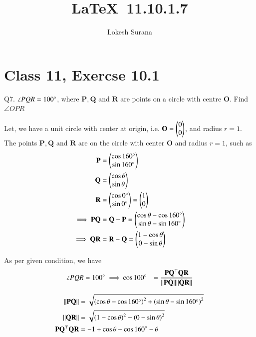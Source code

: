 \documentclass[journal,12pt,twocolumn]{IEEEtran}
\let\vec\mathbf
\begin{document}
\vspace{3cm}
\title{\LaTeX\ 11.10.1.7}
\author{Lokesh Surana}
\maketitle
\section*{Class 11, Exercse 10.1}

Q7. $\angle{PQR} = 100\degree$, where $\vec{P}, \vec{Q}$ and $\vec{R}$ are points on a circle with centre $\vec{O}$. Find $\angle{OPR}$

\solution 
Let, we have a unit circle with center at origin, i.e. $\vec{O} = \myvec{0\\0}$, and radius $r = 1$.
The points $\vec{P}, \vec{Q}$ and $\vec{R}$ are on the circle with center $\vec{O}$ and radius $r = 1$, such as
\begin{align}
    \vec{P} &= \myvec{\cos160\degree\\\sin160\degree} \\
    \vec{Q} &= \myvec{\cos\theta\\\sin\theta}  \\
    \vec{R} &= \myvec{\cos0\degree \\ \sin0\degree} = \myvec{1 \\ 0} \\
    \implies \vec{PQ} &= \vec{Q} - \vec{P} = \myvec{\cos\theta - \cos160\degree \\ \sin\theta - \sin160\degree} \\
    \implies \vec{QR} &= \vec{R} - \vec{Q} = \myvec{1 - \cos\theta \\ 0 - \sin\theta} 
\end{align}

As per given condition, we have
\begin{align}
    \angle{PQR} &= 100\degree 
    \label{eq:1} \implies \cos100\degree &= \frac{\vec{PQ}^\top \vec{QR}}{\norm{\vec{PQ}} \norm{\vec{QR}}} \\
\end{align}

\begin{align}
    \label{eq:2}   \norm{\vec{PQ}} &= \sqrt{\brak{\cos\theta - \cos160\degree}^2 + \brak{\sin\theta - \sin160\degree}^2} \\
    \label{eq:3}    \norm{\vec{QR}} &= \sqrt{\brak{1 - \cos\theta}^2 + \brak{0 - \sin\theta}^2} \\
    \label{eq:4}    \vec{PQ}^\top \vec{QR} &= -1 + \cos\theta + \cos{160\degree - \theta}
\end{align}
\end{document}
